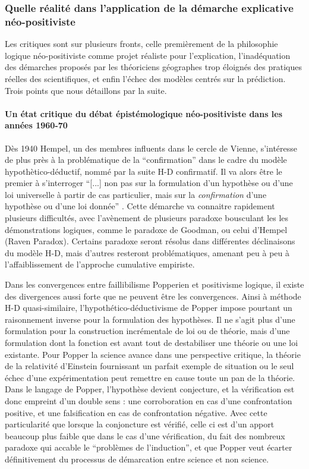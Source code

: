 \subsubsection{Quelle réalité dans l'application de la démarche explicative néo-positiviste}
\label{sssec:realite_neopositiviste}

Les critiques sont sur plusieurs fronts, celle premièrement de la philosophie logique néo-positiviste comme projet réaliste pour l'explication, l'inadéquation des démarches proposés par les théoriciens géographes trop éloignés des pratiques réelles des scientifiques, et enfin l’échec des modèles centrés sur la prédiction. Trois points que nous détaillons par la suite.

\paragraph{Un état critique du débat épistémologique néo-positiviste dans les années 1960-70}

Dès 1940 Hempel, un des membres influents dans le cercle de Vienne, s'intéresse de plus près à la problématique de la \enquote{confirmation} dans le cadre du modèle hypothètico-déductif, nommé par la suite H-D confirmatif. Il va alors être le premier à s'interroger \enquote{[...] non pas sur la formulation d'un hypothèse ou d'une loi universelle à partir de cas particulier, mais sur la \textit{confirmation} d'une hypothèse ou d'une loi donnée} \autocite{Lecourt2006}. Cette démarche va connaitre rapidement plusieurs difficultés, avec l’avènement de plusieurs paradoxe bousculant les les démonstrations logiques, comme le paradoxe de Goodman, ou celui d'Hempel (Raven Paradox). Certains paradoxe seront résolus dans différentes déclinaisons du modèle H-D, mais d'autres resteront problématiques, amenant peu à peu à l'affaiblissement de l'approche cumulative empiriste. 

Dans les convergences entre faillibilisme Popperien et positivisme logique, il existe des divergences aussi forte que ne peuvent être les convergences. Ainsi à méthode H-D quasi-similaire, l'hypothético-déductivisme de Popper impose pourtant un raisonnement inverse pour la formulation des hypothèses. Il ne s'agit plus d'une formulation pour la construction incrémentale de loi ou de théorie, mais d'une formulation dont la fonction est avant tout de destabiliser une théorie ou une loi existante. Pour Popper la science avance dans une perspective critique, la théorie de la relativité d'Einstein fournissant un parfait exemple de situation ou le seul échec d'une expérimentation peut remettre en cause toute un pan de la théorie. Dans le langage de Popper, l'hypothèse devient conjecture, et la vérification est donc empreint d'un double sens : une corroboration en cas d'une confrontation positive, et une falsification en cas de confrontation négative. Avec cette particularité que lorsque la conjoncture est vérifié, celle ci est d'un apport beaucoup plus faible que dans le cas d'une vérification, du fait des nombreux paradoxe qui accable le \enquote{problèmes de l'induction}, et que Popper veut écarter définitivement du processus de démarcation entre science et non science.

